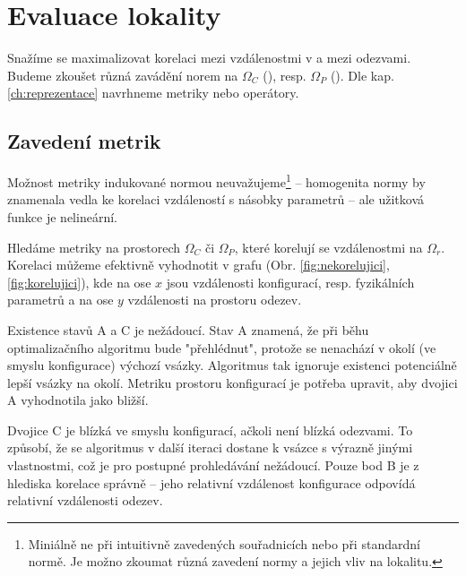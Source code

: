 \chapter{Evaluace lokality}
Snažíme se maximalizovat korelaci mezi vzdálenostmi v  a mezi odezvami. Budeme zkoušet různá zavádění norem na $\Omega_C$ (), resp. $\Omega_P$ (). Dle kap. \ref{ch:reprezentace} navrhneme metriky nebo operátory.

\section{Zavedení metrik}
Možnost metriky indukované normou neuvažujeme\footnote{Miniálně ne při intuitivně zavedených souřadnicích nebo při standardní normě. Je možno zkoumat různá zavedení 
normy a jejich vliv na lokalitu.} -- homogenita normy 
by znamenala vedla ke korelaci 
vzdáleností s násobky parametrů -- ale užitková funkce je nelineární. 

Hledáme metriky na prostorech $\Omega_C$ či $\Omega_P$, které korelují 
se vzdálenostmi na $\Omega_r$. Korelaci můžeme efektivně vyhodnotit 
v grafu (Obr. \ref{fig:nekorelujici}, \ref{fig:korelujici}), kde na ose $x$ jsou vzdálenosti 
konfigurací, resp. fyzikálních parametrů a na ose $y$ vzdálenosti na 
prostoru odezev. 


Existence stavů A a C je nežádoucí. Stav A znamená, že při běhu optimalizačního algoritmu bude "přehlédnut", protože se nenachází v okolí (ve smyslu 
konfigurace) výchozí vsázky. Algoritmus tak ignoruje existenci potenciálně lepší vsázky na okolí. Metriku prostoru konfigurací je potřeba upravit, 
aby dvojici A vyhodnotila jako bližší.

Dvojice C je blízká ve smyslu konfigurací, ačkoli není blízká odezvami. To způsobí, že se algoritmus v další iteraci dostane k vsázce s výrazně jinými 
vlastnostmi, což je pro postupné prohledávání nežádoucí. Pouze bod B je z hlediska korelace správně -- jeho relativní vzdálenost konfigurace odpovídá 
relativní vzdálenosti odezev. 

